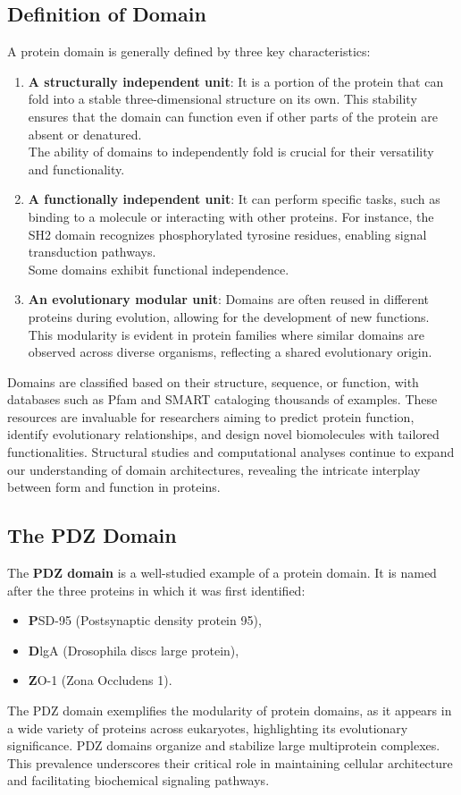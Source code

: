 \documentclass[English, Lau, oneside]{sapthesis}
\begin{document}
\subsection{Definition of Domain}
\noindent A protein domain is generally defined by three key characteristics:\cite{ref8}
\begin{enumerate}
    \item \textbf{A structurally independent unit}: It is a portion of the protein that can fold into a stable three-dimensional structure on its own. This stability ensures that the domain can function even if other parts of the protein are absent or denatured. \\
    The ability of domains to independently fold is crucial for their versatility and functionality.
    \item \textbf{A functionally independent unit}: It can perform specific tasks, such as binding to a molecule or interacting with other proteins. For instance, the SH2 domain recognizes phosphorylated tyrosine residues, enabling signal transduction pathways.\\
    Some domains exhibit functional independence.
    \item \textbf{An evolutionary modular unit}: Domains are often reused in different proteins during evolution, allowing for the development of new functions. This modularity is evident in protein families where similar domains are observed across diverse organisms, reflecting a shared evolutionary origin. 
\end{enumerate}

Domains are classified based on their structure, sequence, or function, with databases such as Pfam and SMART cataloging thousands of examples.\cite{pfam} These resources are invaluable for researchers aiming to predict protein function, identify evolutionary relationships, and design novel biomolecules with tailored functionalities. Structural studies and computational analyses continue to expand our understanding of domain architectures, revealing the intricate interplay between form and function in proteins.

\subsection{The PDZ Domain}
\noindent The \textbf{PDZ domain} is a well-studied example of a protein domain. It is named after the three proteins in which it was first identified:\cite{ref8}
\begin{itemize}
    \item \textbf{P}SD-95 (Postsynaptic density protein 95),
    \item \textbf{D}lgA (Drosophila discs large protein),
    \item \textbf{Z}O-1 (Zona Occludens 1).
\end{itemize}
The PDZ domain exemplifies the modularity of protein domains, as it appears in a wide variety of proteins across eukaryotes, highlighting its evolutionary significance. PDZ domains organize and stabilize large multiprotein complexes. This prevalence underscores their critical role in maintaining cellular architecture and facilitating biochemical signaling pathways.
\end{document}
